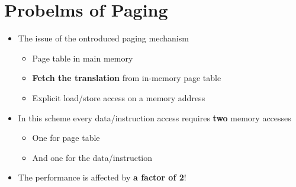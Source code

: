 \documentclass[a4paper,11pt,english]{article}
\begin{document}
\section*{Probelms of Paging}
\begin{itemize}
    \item The issue of the ontroduced paging mechanism
        \begin{itemize}
            \item Page table in main memory
            \item \textbf{\color{red} Fetch the translation} from in-memory page table
            \item Explicit load/store access on a memory address
        \end{itemize}
    \item In this scheme every data/instruction access requires \textbf{\color{red} two} memory accesses
        \begin{itemize}
            \item One for page table
            \item And one for the data/instruction
        \end{itemize}
    \item The performance is affected by \textbf{\color{red} a factor of 2}!
\end{itemize}
\end{document}
